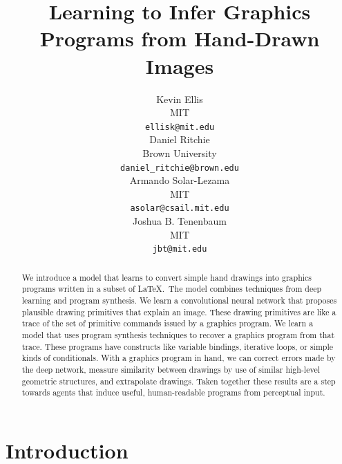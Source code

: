 \documentclass{article}
\title{Learning to Infer Graphics Programs from Hand-Drawn Images}
\author{
Kevin Ellis\\
  MIT\\
  \texttt{ellisk@mit.edu} \\
  \And
  Daniel Ritchie\\
Brown University\\
 \texttt{daniel\_ritchie@brown.edu} \\
 \And
 Armando Solar-Lezama\\
 MIT\\
\texttt{asolar@csail.mit.edu} \\
\And
Joshua B. Tenenbaum \\
MIT\\
\texttt{jbt@mit.edu}
}
\theoremstyle{definition}
\begin{document}

\maketitle

\begin{abstract}
  We introduce a model that learns to convert simple hand drawings
  into graphics programs written in a subset of \LaTeX.~The model
  combines techniques from deep learning and program synthesis.  We
  learn a convolutional neural network that proposes plausible drawing
  primitives that explain an image. These drawing primitives are
  like a trace of the set of primitive commands issued by a graphics
  program. We learn a model that uses program synthesis techniques to
  recover a graphics program from that trace. These programs have constructs like variable
  bindings, iterative loops, or simple kinds of conditionals. With a
  graphics program in hand, we can correct errors made by the deep
  network, measure similarity between drawings by use of similar high-level geometric
  structures, and extrapolate drawings.  Taken together these results
  are a step towards agents that induce useful, human-readable
  programs from perceptual input.
\end{abstract}

\section{Introduction}
\end{document}
